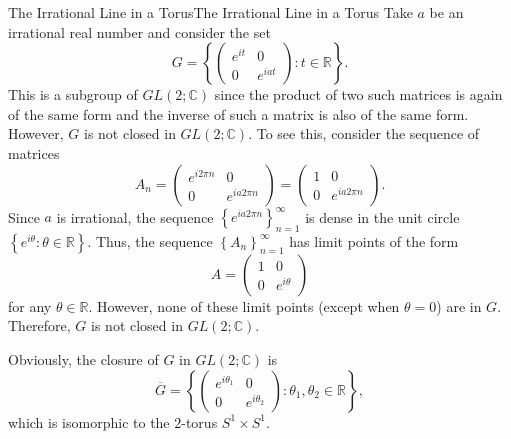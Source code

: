 \documentclass[../main.tex]{subfiles}
\begin{document}
\begin{example}{The Irrational Line in a Torus}{The Irrational Line in a Torus}
	Take $a$ be an irrational real number and consider the set
	\begin{equation*}
		G = \left\{ \begin{pmatrix}
			e^{i t} & 0         \\
			0       & e^{i a t}
		\end{pmatrix} : t \in \mathbb{R} \right\}.
	\end{equation*}
	This is a subgroup of $GL(2;\mathbb{C})$ since the product of two such matrices is again of the same form and the inverse of such a matrix is also of the same form. However, $G$ is not closed in $GL(2;\mathbb{C})$. To see this, consider the sequence of matrices
	\begin{equation*}
		A_n = \begin{pmatrix}
			e^{i 2 \pi n} & 0               \\
			0             & e^{i a 2 \pi n}
		\end{pmatrix} = \begin{pmatrix}
			1 & 0               \\
			0 & e^{i a 2 \pi n}
		\end{pmatrix}.
	\end{equation*}
	Since $a$ is irrational, the sequence $\left\{ e^{i a 2 \pi n} \right\}_{n=1}^{\infty}$ is dense in the unit circle $\left\{ e^{i \theta} : \theta \in \mathbb{R} \right\}$. Thus, the sequence $\left\{ A_n \right\}_{n=1}^{\infty}$ has limit points of the form
	\begin{equation*}
		A = \begin{pmatrix}
			1 & 0            \\
			0 & e^{i \theta}
		\end{pmatrix}
	\end{equation*}
	for any $\theta \in \mathbb{R}$. However, none of these limit points (except when $\theta = 0$) are in $G$. Therefore, $G$ is not closed in $GL(2;\mathbb{C})$.

	Obviously, the closure of $G$ in $GL(2;\mathbb{C})$ is
	\begin{equation*}
		\overline{G} = \left\{ \begin{pmatrix}
			e^{i \theta_1} & 0              \\
			0              & e^{i \theta_2}
		\end{pmatrix} : \theta_1, \theta_2 \in \mathbb{R} \right\},
	\end{equation*}
	which is isomorphic to the $2$-torus $S^1 \times S^1$.
\end{example}
\end{document}
